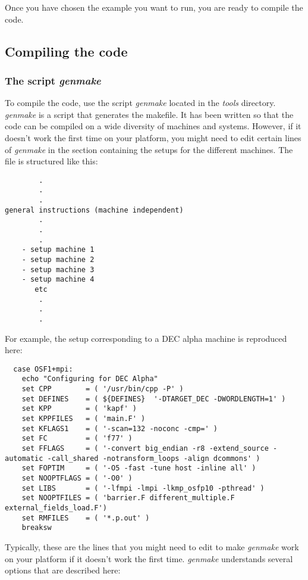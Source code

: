 Once you have chosen the example you want to run, you are ready to compile
the code.

\subsection{Compiling the code}

\subsubsection{The script \textit{genmake}}

To compile the code, use the script \textit{genmake} located in the \textit{%
tools} directory. \textit{genmake} is a script that generates the makefile.
It has been written so that the code can be compiled on a wide diversity of
machines and systems. However, if it doesn't work the first time on your
platform, you might need to edit certain lines of \textit{genmake} in the
section containing the setups for the different machines. The file is
structured like this:
\begin{verbatim}
        .
        .
        .
general instructions (machine independent)
        .
        .
        .
    - setup machine 1
    - setup machine 2
    - setup machine 3
    - setup machine 4
       etc
        .
        .
        .
\end{verbatim}

For example, the setup corresponding to a DEC alpha machine is reproduced
here:
\begin{verbatim}
  case OSF1+mpi:
    echo "Configuring for DEC Alpha"
    set CPP        = ( '/usr/bin/cpp -P' )
    set DEFINES    = ( ${DEFINES}  '-DTARGET_DEC -DWORDLENGTH=1' )
    set KPP        = ( 'kapf' )
    set KPPFILES   = ( 'main.F' )
    set KFLAGS1    = ( '-scan=132 -noconc -cmp=' )
    set FC         = ( 'f77' )
    set FFLAGS     = ( '-convert big_endian -r8 -extend_source -automatic -call_shared -notransform_loops -align dcommons' )
    set FOPTIM     = ( '-O5 -fast -tune host -inline all' )
    set NOOPTFLAGS = ( '-O0' )
    set LIBS       = ( '-lfmpi -lmpi -lkmp_osfp10 -pthread' )
    set NOOPTFILES = ( 'barrier.F different_multiple.F external_fields_load.F')
    set RMFILES    = ( '*.p.out' )
    breaksw
\end{verbatim}

Typically, these are the lines that you might need to edit to make \textit{%
genmake} work on your platform if it doesn't work the first time. \textit{%
genmake} understands several options that are described here:

